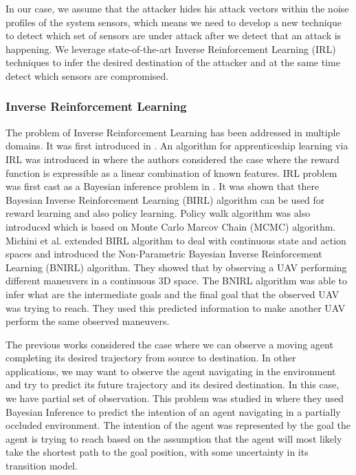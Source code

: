 \documentclass[conference]{IEEEtran}
\begin{document}
In our case, we assume that the attacker hides his attack vectors within the noise profiles of the system sensors, which means we need to develop a new technique to detect which set of sensors are under attack after we detect that an attack is happening. We leverage state-of-the-art Inverse Reinforcement Learning (IRL) techniques to infer the desired destination of the attacker and at the same time detect which sensors are compromised.

\subsubsection{Inverse Reinforcement Learning}
The problem of Inverse Reinforcement Learning has been addressed in multiple domains. It was first introduced in \cite{Ng2000}. An algorithm for apprenticeship learning via IRL was introduced in \cite{Abbeel2004a} where the authors considered the case where the reward function is expressible as a linear combination of known features. IRL problem was first cast as a Bayesian inference problem in  \cite{Ramachandran2007}. It was shown that there Bayesian Inverse Reinforcement Learning (BIRL) algorithm can be used for reward learning and also policy learning. Policy walk algorithm was also introduced which is based on Monte Carlo Marcov Chain (MCMC) algorithm. Michini et al. \cite{Michini2015,Michini2013,Michini2012} extended BIRL algorithm to deal with continuous state and action spaces and introduced the Non-Parametric Bayesian Inverse Reinforcement Learning (BNIRL) algorithm. They  showed that by observing a UAV performing different maneuvers in a continuous 3D space. The BNIRL algorithm was able to infer what are the intermediate goals and the final goal that the observed UAV was trying to reach. They used this predicted information to make another UAV perform the same observed maneuvers.

The previous works considered the case where we can observe a moving agent completing its desired trajectory from source to destination. In other applications, we may want to observe the agent navigating in the environment and try to predict its future trajectory and its desired destination. In this case, we have partial set of observation. This problem was studied in \cite{Best2015} where they used Bayesian Inference to predict the intention of an agent navigating in a partially occluded environment. The intention of the agent was represented by the goal the agent is trying to reach based on the assumption that the agent will most likely take the shortest path to the goal position, with some uncertainty in its transition model.
\end{document}
